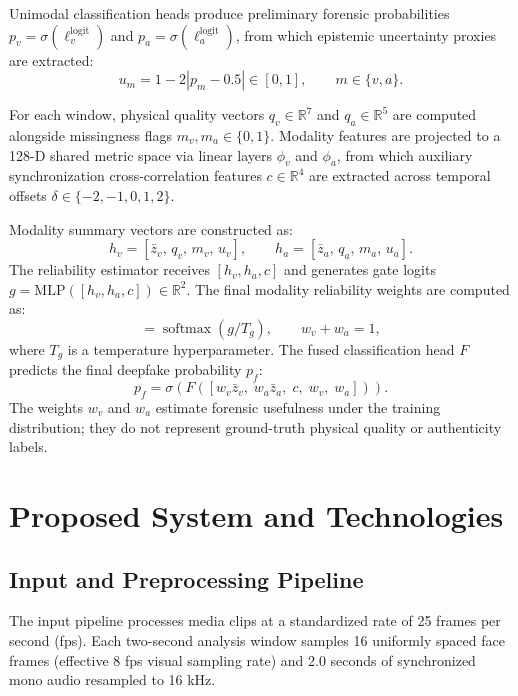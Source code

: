 \documentclass[conference]{IEEEtran}
\begin{document}
Unimodal classification heads produce preliminary forensic probabilities $p_v = \sigma(\ell_v^{\mathrm{logit}})$ and $p_a = \sigma(\ell_a^{\mathrm{logit}})$, from which epistemic uncertainty proxies are extracted:
\begin{equation}
  u_m = 1 - 2|p_m - 0.5| \in [0, 1], \qquad m \in \{v, a\}.
\end{equation}

For each window, physical quality vectors $q_v \in \mathbb{R}^7$ and $q_a \in \mathbb{R}^5$ are computed alongside missingness flags $m_v, m_a \in \{0, 1\}$. Modality features are projected to a 128-D shared metric space via linear layers $\phi_v$ and $\phi_a$, from which auxiliary synchronization cross-correlation features $c \in \mathbb{R}^4$ are extracted across temporal offsets $\delta \in \{-2, -1, 0, 1, 2\}$.

Modality summary vectors are constructed as:
\begin{equation}
  h_v = [\bar{z}_v, \, q_v, \, m_v, \, u_v], \qquad h_a = [\bar{z}_a, \, q_a, \, m_a, \, u_a].
\end{equation}
The reliability estimator receives $[h_v, h_a, c]$ and generates gate logits $g = \mathrm{MLP}([h_v, h_a, c]) \in \mathbb{R}^2$. The final modality reliability weights are computed as:
\begin{equation}
  [w_v, w_a] = \operatorname{softmax}(g / T_g), \qquad w_v + w_a = 1,
\end{equation}
where $T_g$ is a temperature hyperparameter. The fused classification head $F$ predicts the final deepfake probability $p_f$:
\begin{equation}
  p_f = \sigma(F([w_v \bar{z}_v, \; w_a \bar{z}_a, \; c, \; w_v, \; w_a])).
\end{equation}
The weights $w_v$ and $w_a$ estimate forensic usefulness under the training distribution; they do not represent ground-truth physical quality or authenticity labels.

\section{Proposed System and Technologies}

\subsection{Input and Preprocessing Pipeline}
The input pipeline processes media clips at a standardized rate of 25 frames per second (fps). Each two-second analysis window samples 16 uniformly spaced face frames (effective 8 fps visual sampling rate) and 2.0 seconds of synchronized mono audio resampled to 16 kHz. 
\end{document}
